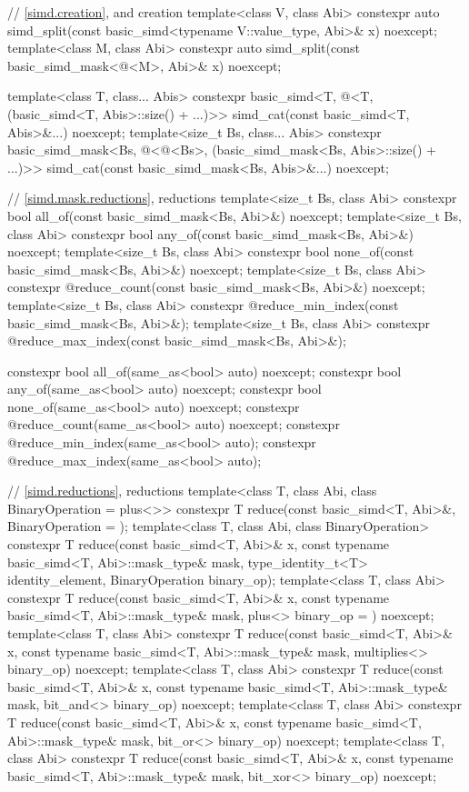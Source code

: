 \begin{codeblock}
{  // \ref{simd.creation},  and  creation
  template<class V, class Abi>
    constexpr auto
      simd_split(const basic_simd<typename V::value_type, Abi>& x) noexcept;
  template<class M, class Abi>
    constexpr auto
      simd_split(const basic_simd_mask<@\maskelementsize@<M>, Abi>& x) noexcept;

  template<class T, class... Abis>
    constexpr basic_simd<T, @\deducet@<T, (basic_simd<T, Abis>::size() + ...)>>
      simd_cat(const basic_simd<T, Abis>&...) noexcept;
  template<size_t Bs, class... Abis>
    constexpr basic_simd_mask<Bs, @\deducet@<@\integerfrom@<Bs>,
                              (basic_simd_mask<Bs, Abis>::size() + ...)>>
      simd_cat(const basic_simd_mask<Bs, Abis>&...) noexcept;

  // \ref{simd.mask.reductions},  reductions
  template<size_t Bs, class Abi>
    constexpr bool all_of(const basic_simd_mask<Bs, Abi>&) noexcept;
  template<size_t Bs, class Abi>
    constexpr bool any_of(const basic_simd_mask<Bs, Abi>&) noexcept;
  template<size_t Bs, class Abi>
    constexpr bool none_of(const basic_simd_mask<Bs, Abi>&) noexcept;
  template<size_t Bs, class Abi>
    constexpr @\simdsizetype@ reduce_count(const basic_simd_mask<Bs, Abi>&) noexcept;
  template<size_t Bs, class Abi>
    constexpr @\simdsizetype@ reduce_min_index(const basic_simd_mask<Bs, Abi>&);
  template<size_t Bs, class Abi>
    constexpr @\simdsizetype@ reduce_max_index(const basic_simd_mask<Bs, Abi>&);

  constexpr bool all_of(same_as<bool> auto) noexcept;
  constexpr bool any_of(same_as<bool> auto) noexcept;
  constexpr bool none_of(same_as<bool> auto) noexcept;
  constexpr @\simdsizetype@ reduce_count(same_as<bool> auto) noexcept;
  constexpr @\simdsizetype@ reduce_min_index(same_as<bool> auto);
  constexpr @\simdsizetype@ reduce_max_index(same_as<bool> auto);

  // \ref{simd.reductions},  reductions
  template<class T, class Abi, class BinaryOperation = plus<>>
    constexpr T reduce(const basic_simd<T, Abi>&, BinaryOperation = {});
  template<class T, class Abi, class BinaryOperation>
    constexpr T reduce(const basic_simd<T, Abi>& x,
      const typename basic_simd<T, Abi>::mask_type& mask, type_identity_t<T> identity_element,
      BinaryOperation binary_op);
  template<class T, class Abi>
    constexpr T reduce(const basic_simd<T, Abi>& x,
      const typename basic_simd<T, Abi>::mask_type& mask, plus<> binary_op = {}) noexcept;
  template<class T, class Abi>
    constexpr T reduce(const basic_simd<T, Abi>& x,
      const typename basic_simd<T, Abi>::mask_type& mask, multiplies<> binary_op) noexcept;
  template<class T, class Abi>
    constexpr T reduce(const basic_simd<T, Abi>& x,
      const typename basic_simd<T, Abi>::mask_type& mask, bit_and<> binary_op) noexcept;
  template<class T, class Abi>
    constexpr T reduce(const basic_simd<T, Abi>& x,
      const typename basic_simd<T, Abi>::mask_type& mask, bit_or<> binary_op) noexcept;
  template<class T, class Abi>
    constexpr T reduce(const basic_simd<T, Abi>& x,
      const typename basic_simd<T, Abi>::mask_type& mask, bit_xor<> binary_op) noexcept;

}
\end{codeblock}
